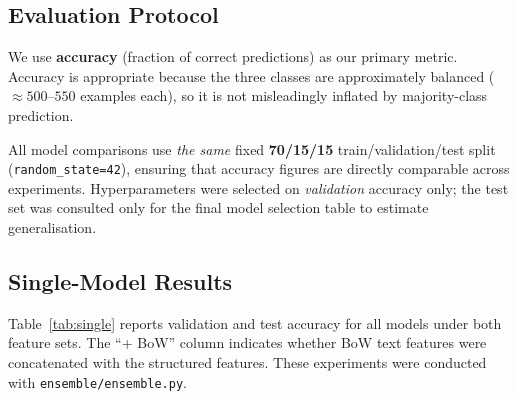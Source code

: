 \documentclass[11pt,letterpaper]{article}
\begin{document}
\subsection{Evaluation Protocol}

We use \textbf{accuracy} (fraction of correct predictions) as our primary metric.
Accuracy is appropriate because the three classes are approximately balanced
($\approx500$--$550$ examples each), so it is not misleadingly inflated by
majority-class prediction.

All model comparisons use \emph{the same} fixed \textbf{70/15/15}
train/validation/test split (\texttt{random\_state=42}), ensuring that accuracy
figures are directly comparable across experiments. Hyperparameters were selected
on \emph{validation} accuracy only; the test set was consulted only for the
final model selection table to estimate generalisation.

\subsection{Single-Model Results}

Table~\ref{tab:single} reports validation and test accuracy for all models under
both feature sets. The ``+ BoW'' column indicates whether BoW text features
were concatenated with the structured features. These experiments were conducted
with \texttt{ensemble/ensemble.py}.
\end{document}
